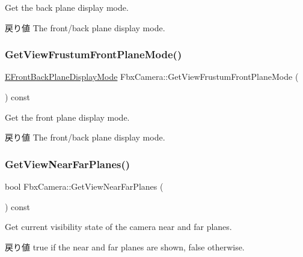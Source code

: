 Get the back plane display mode. \begin{DoxyReturn}{戻り値}
The front/back plane display mode. 
\end{DoxyReturn}
\mbox{\label{class_fbx_camera_a83d93dc9f981ac175f8dfecfa0cf15eb}} 
\subsubsection{\texorpdfstring{Get\+View\+Frustum\+Front\+Plane\+Mode()}{GetViewFrustumFrontPlaneMode()}}
{\footnotesize\ttfamily \hyperlink{class_fbx_camera_ab7b9d3e546552049a79261a444f9b44a}{E\+Front\+Back\+Plane\+Display\+Mode} Fbx\+Camera\+::\+Get\+View\+Frustum\+Front\+Plane\+Mode (\begin{DoxyParamCaption}{ }\end{DoxyParamCaption}) const}

Get the front plane display mode. \begin{DoxyReturn}{戻り値}
The front/back plane display mode. 
\end{DoxyReturn}
\mbox{\label{class_fbx_camera_a17d96c024f27e60b04ce3748383db422}} 
\subsubsection{\texorpdfstring{Get\+View\+Near\+Far\+Planes()}{GetViewNearFarPlanes()}}
{\footnotesize\ttfamily bool Fbx\+Camera\+::\+Get\+View\+Near\+Far\+Planes (\begin{DoxyParamCaption}{ }\end{DoxyParamCaption}) const}

Get current visibility state of the camera near and far planes. \begin{DoxyReturn}{戻り値}
{\ttfamily true} if the near and far planes are shown, {\ttfamily false} otherwise. 
\end{DoxyReturn}
\mbox{\label{class_fbx_camera_a19568019c2c2be2188688ad1c059a9b7}} 
